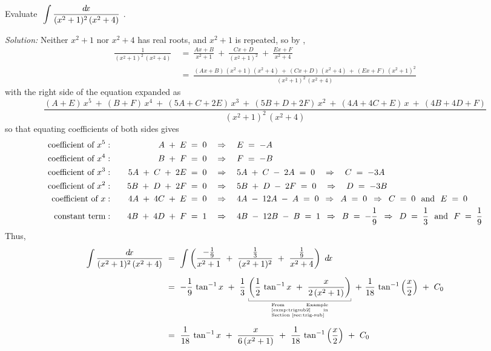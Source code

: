 \begin{exmp}\label{exmp:partfrac5}
\noindent Evaluate $~\displaystyle\int \frac{d\!x}{(x^2+1)^2\,(x^2+4)}~$.\vspace{1mm}
\par\noindent\emph{Solution:} Neither $x^2 + 1$ nor $x^2 + 4$ has real roots,
and $x^2 + 1$ is repeated, so by ,
\begin{align*}
\frac{1}{(x^2+1)^2\,(x^2+4)} ~&=~ \frac{Ax+B}{x^2+1} ~+~ \frac{Cx+D}{(x^2+1)^2} ~+~
 \frac{Ex+F}{x^2+4}\\[4pt]
&=~ \frac{(Ax+B)\,(x^2+1)\,(x^2+4) ~+~ (Cx+D)\,(x^2+4) ~+~ (Ex+F)\,(x^2+1)^2}{(x^2+1)^2\,(x^2+4)}
\end{align*}
with the right side of the equation expanded as
\[
\frac{(A+E)\,x^5 ~+~ (B+F)\,x^4 ~+~ (5A+C+2E)\,x^3 ~+~ (5B+D+2F)\,x^2 ~+~ (4A+4C+E)\,x
 ~+~ (4B+4D+F)}{(x^2+1)^2\,(x^2+4)}
\]
so that equating coefficients of both sides gives
\begin{alignat*}{3}
\text{coefficient of $x^5$}&: \quad & A \;+\; E \;&=\; 0 \quad\Rightarrow\quad E \;=\; -A\\
\text{coefficient of $x^4$}&: \quad & B \;+\; F \;&=\; 0 \quad\Rightarrow\quad F \;=\; -B\\
\text{coefficient of $x^3$}&: \quad & 5A \;+\; C \;+\; 2E \;&=\; 0
 \quad\Rightarrow\quad 5A \;+\; C \;-\; 2A \;=\; 0 \quad\Rightarrow\quad C \;=\; -3A\\
\text{coefficient of $x^2$}&: \quad & 5B \;+\; D \;+\; 2F \;&=\; 0
 \quad\Rightarrow\quad 5B \;+\; D \;-\; 2F \;=\; 0 \quad\Rightarrow\quad D \;=\; -3B\\
\text{coefficient of $x$}&: \quad & 4A \;+\; 4C \;+\; E \;&=\; 0
 \quad\Rightarrow\quad 4A \;-\; 12A  \;-\; A \;=\; 0
 \enskip\Rightarrow\enskip A \;=\; 0 \enskip\Rightarrow\enskip C \;=\; 0 ~~\text{and}~~ E \;=\; 0\\
\text{constant term}&: \quad & 4B \;+\; 4D \;+\; F \;&=\; 1
 \quad\Rightarrow\quad 4B \;-\; 12B  \;-\; B \;=\; 1
 \enskip\Rightarrow\enskip B \;=\; -\frac{1}{9}
 \enskip\Rightarrow\enskip D \;=\; \frac{1}{3} ~~\text{and}~~ F \;=\; \frac{1}{9}
\end{alignat*}
Thus,
\begin{align*}
\int \frac{\dx}{(x^2+1)^2\,(x^2+4)} ~&=~ \int \left(\frac{-\frac{1}{9}}{x^2+1} ~+~
 \frac{\frac{1}{3}}{(x^2+1)^2} ~+~ \frac{\frac{1}{9}}{x^2+4}\right)~\dx\\[6pt]
&=~ -\frac{1}{9}\,\tan^{-1} x ~+~
     \frac{1}{3}\,
     \underbracket[0.3pt]{\left(\frac{1}{2}\,\tan^{-1} x ~+~ \frac{x}{2\,(x^2 + 1)}\right)}
     _{\begin{minipage}[t]{0.194\linewidth}
         \tiny
         From Example \ref{exmp:trigsub2} in Section~\ref{sec:trig-sub}
     \end{minipage}}
     ~+~
     \frac{1}{18}\,\tan^{-1}\left(\frac{x}{2}\right) ~+~ C_0\\[6pt]
&=~ \frac{1}{18}\,\tan^{-1} x ~+~ \frac{x}{6\,(x^2 + 1)} ~+~
    \frac{1}{18}\,\tan^{-1}\left(\frac{x}{2}\right) ~+~ C_0
\end{align*}
\end{exmp}
\divider
\vspace{2mm}


